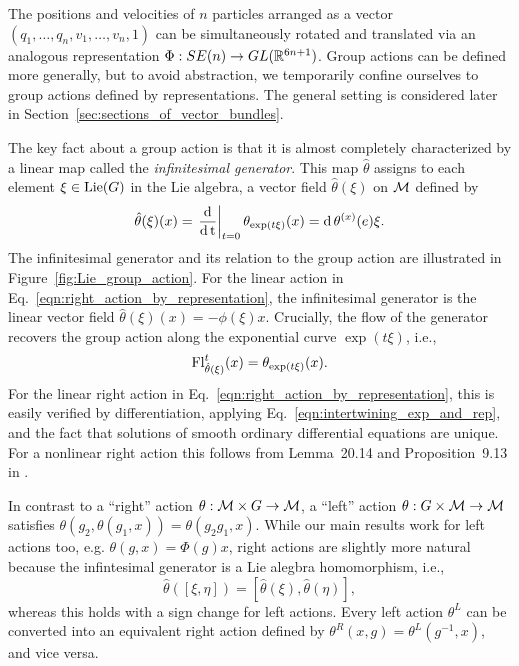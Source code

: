 \documentclass[twoside,11pt]{article}
\begin{document}
The positions and velocities of $n$ particles arranged as a vector $(q_1, \ldots, q_n, v_1, \ldots, v_n, 1)$ can be simultaneously rotated and translated via an analogous representation $\Phi: SE(n) \to GL(\mathbb{R}^{6n + 1})$.
Group actions can be defined more generally, but to avoid abstraction, we temporarily confine ourselves to group actions defined by representations.
The general setting is considered later in Section~\ref{sec:sections_of_vector_bundles}.

The key fact about a group action is that it is almost completely characterized by a linear map called the \emph{infinitesimal generator}.
This map $\hat{\theta}$ assigns to each element $\xi\in\operatorname{Lie}(G)$ in the Lie algebra, a vector field $\hat{\theta}(\xi)$ on ${\mathcal{M}}$ defined by
\begin{equation}
    \hat{\theta}(\xi)(x) 
    = \left.\operatorname{\frac{\operatorname{\mathrm{d}}}{\operatorname{\mathrm{d}} t}}\right\vert_{t=0} \theta_{\exp(t\xi)}(x)
    = \operatorname{\mathrm{d}} \theta^{(x)}(e) \xi.
\end{equation}
The infinitesimal generator and its relation to the group action are illustrated in Figure~\ref{fig:Lie_group_action}.
For the linear action in Eq.~\ref{eqn:right_action_by_representation}, the infinitesimal generator is the linear vector field $\hat{\theta}(\xi)(x) = -\phi(\xi) x$.
Crucially, the flow of the generator recovers the group action along the exponential curve $\exp(t\xi)$, i.e.,
\begin{equation}
    \operatorname{Fl}_{\hat{\theta}(\xi)}^t(x) 
    = \theta_{\exp(t\xi)}(x).
\end{equation}
For the linear right action in Eq.~\ref{eqn:right_action_by_representation}, this is easily verified by differentiation, applying Eq.~\ref{eqn:intertwining_exp_and_rep}, and the fact that solutions of smooth ordinary differential equations are unique.
For a nonlinear right action this follows from Lemma~20.14 and Proposition~9.13 in \cite{Lee2013introduction}.

\begin{remark}
    In contrast to a ``right'' action $\theta: {\mathcal{M}} \times G \to {\mathcal{M}}$, a ``left'' action $\theta: G \times {\mathcal{M}} \to {\mathcal{M}}$ satisfies ${\theta(g_2, \theta(g_1,x)) = \theta(g_2 g_1, x)}$.
    While our main results work for left actions too, e.g. $\theta(g,x) = \Phi(g) x$, right actions are slightly more natural because the infintesimal generator is a Lie alegbra homomorphism, i.e.,
    \begin{equation}
        \hat{\theta}([\xi, \eta]) = [\hat{\theta}(\xi), \hat{\theta}(\eta)],
    \end{equation}
    whereas this holds with a sign change for left actions.
    Every left action $\theta^L$ can be converted into an equivalent right action defined by $\theta^R(x,g) = \theta^L(g^{-1},x)$, and vice versa.
\end{remark}
\end{document}
